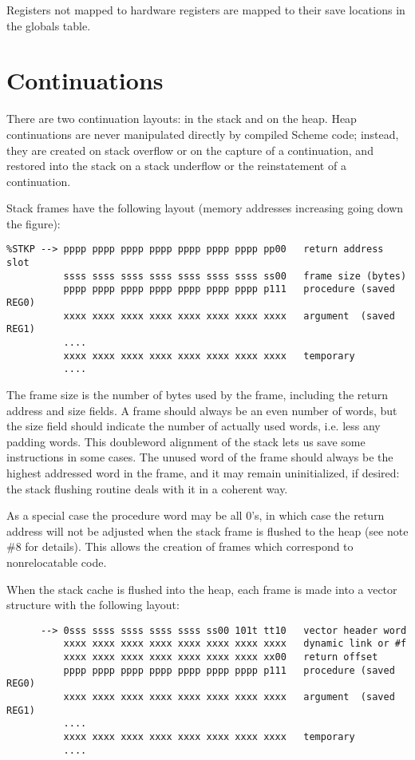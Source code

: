 Registers not mapped to hardware registers are mapped to their save locations
in the globals table.

\section{Continuations}

There are two continuation layouts: in the stack and on the heap. Heap
continuations are never manipulated directly by compiled Scheme code;
instead, they are created on stack overflow or on the capture of a
continuation, and restored into the stack on a stack underflow or the
reinstatement of a continuation.

Stack frames have the following layout (memory addresses increasing
going down the figure):

\begin{minipage}{\linewidth}
\begin{verbatim}
%STKP --> pppp pppp pppp pppp pppp pppp pppp pp00   return address slot
          ssss ssss ssss ssss ssss ssss ssss ss00   frame size (bytes)
          pppp pppp pppp pppp pppp pppp pppp p111   procedure (saved REG0)
          xxxx xxxx xxxx xxxx xxxx xxxx xxxx xxxx   argument  (saved REG1)
          ....
          xxxx xxxx xxxx xxxx xxxx xxxx xxxx xxxx   temporary
          ....
\end{verbatim}
\end{minipage}

The frame size is the number of bytes used by the frame, including the
return address and size fields.  A frame should always be an even
number of words, but the size field should indicate the number of
actually used words, i.e. less any padding words. This doubleword
alignment of the stack lets us save some instructions in some cases.
The unused word of the frame should always be the highest addressed word
in the frame, and it may remain uninitialized, if desired: the stack
flushing routine deals with it in a coherent way.

As a special case the procedure word may be all 0's, in which case the
return address will not be adjusted when the stack frame is flushed to the
heap (see note \#8 for details). This allows the creation of frames which
correspond to nonrelocatable code.

When the stack cache is flushed into the heap, each frame is made into
a vector structure with the following layout:

\begin{minipage}{\linewidth}
\begin{verbatim}
      --> 0sss ssss ssss ssss ssss ss00 101t tt10   vector header word
          xxxx xxxx xxxx xxxx xxxx xxxx xxxx xxxx   dynamic link or #f
          xxxx xxxx xxxx xxxx xxxx xxxx xxxx xx00   return offset
          pppp pppp pppp pppp pppp pppp pppp p111   procedure (saved REG0)
          xxxx xxxx xxxx xxxx xxxx xxxx xxxx xxxx   argument  (saved REG1)
          ....
          xxxx xxxx xxxx xxxx xxxx xxxx xxxx xxxx   temporary
          ....
\end{verbatim}
\end{minipage}

